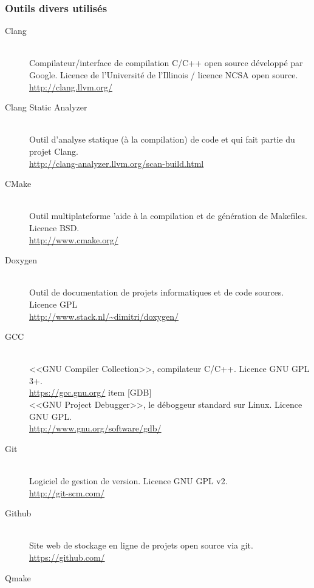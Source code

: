 \documentclass[a4paper,french,12pt]{article}
\begin{document}
		
		
		\subsubsection{Outils divers utilisés}
		  \begin{description}  
		  \item [Clang]~\\
		      Compilateur/interface de compilation C/C++ open source développé par Google.
		      Licence de l'Université de l'Illinois / licence  NCSA open source.\\
		      \url{http://clang.llvm.org/}
		  \item [Clang Static Analyzer]~\\
		      Outil d'analyse statique (à la compilation) de code et qui fait partie du projet Clang. \\
		      \url{http://clang-analyzer.llvm.org/scan-build.html}
		  \item [CMake]~\\
		      Outil multiplateforme 'aide à la compilation et de génération de Makefiles.
		      Licence BSD.\\
		      \url{http://www.cmake.org/}
		  \item [Doxygen]~\\
		    Outil de documentation de projets informatiques et de code sources.
		    Licence GPL\\
		    \url{http://www.stack.nl/~dimitri/doxygen/}
		  \item [GCC]~\\
		      <<GNU Compiler Collection>>, compilateur C/C++.
		      Licence GNU GPL 3+.\\
		      \url{https://gcc.gnu.org/}
		  item [GDB]~\\
		      <<GNU Project Debugger>>, le déboggeur standard sur Linux.
		      Licence GNU GPL.\\
		      \url{http://www.gnu.org/software/gdb/}
		  \item [Git]~\\
		      Logiciel de gestion de version.
		      Licence GNU GPL v2.\\
		      \url{http://git-scm.com/}
		  \item [Github]~\\
		      Site web de stockage en ligne de projets open source via git.\\
		      \url{https://github.com/}
		  \item [Qmake]~\\

\end{description}
\end{document}
